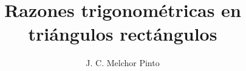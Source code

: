 \documentclass[12pt]{guia}
\title{Razones trigonométricas en triángulos rectángulos}
\author{J. C. Melchor Pinto}
\begin{document}
\pagestyle{headandfoot}
\addpoints
\INFO
\printanswers
\vspace{-0.9cm}
\begin{multicols}{2}
    \columnbreak
\end{multicols}
%
% 
% 
\begin{questions}
    \questionboxed[10]{}
    \questionboxed[10]{}
    \questionboxed[10]{}
    \questionboxed[10]{}
    \questionboxed[10]{}
    \questionboxed[10]{}
    \questionboxed[10]{}
    \questionboxed[10]{}
    \questionboxed[10]{}
    \questionboxed[10]{}
    \questionboxed[10]{}
    \questionboxed[10]{}
    \questionboxed[10]{}
    \questionboxed[10]{}
    \questionboxed[10]{}
    \questionboxed[10]{}
    \questionboxed[10]{}
    \questionboxed[10]{}
\end{questions}
\end{document}
